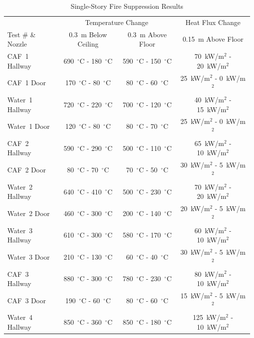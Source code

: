 \documentclass[12pt,oneside]{book}
\begin{document}
\begin{table}[!ht]
\centering
\caption{Single-Story Fire Suppression Results}\label{tab:Test_Results}
\begin{tabular}{lccc}
\toprule[1.5pt]
                 & \multicolumn{2}{c}{Temperature Change}                                    & Heat Flux Change \\
Test \# \& Nozzle	         & 0.3~m Below Ceiling                 & 0.3~m  Above Floor	                 & 0.15~m Above Floor \\
\midrule
CAF~1 Hallway    & 690~$^{\circ}$C - 180~$^{\circ}$C   & 590~$^{\circ}$C - 150~$^{\circ}$C   & 70~kW/m$^2$ - 20~kW/m$^2$  \\
CAF~1 Door       & 170~$^{\circ}$C - 80~$^{\circ}$C    & 80~$^{\circ}$C - 60~$^{\circ}$C     & 25~kW/m$^2$ - 0~kW/m$^2$  \\ [.25cm]
Water~1 Hallway  & 720~$^{\circ}$C - 220~$^{\circ}$C   & 700~$^{\circ}$C - 120~$^{\circ}$C   & 40~kW/m$^2$ - 15~kW/m$^2$  \\
Water~1 Door     & 120~$^{\circ}$C - 80~$^{\circ}$C    & 80~$^{\circ}$C - 70~$^{\circ}$C     & 25~kW/m$^2$ - 0~kW/m$^2$  \\ [.25cm]
CAF~2 Hallway    & 590~$^{\circ}$C - 290~$^{\circ}$C   & 500~$^{\circ}$C - 110~$^{\circ}$C   & 65~kW/m$^2$ - 10~kW/m$^2$  \\
CAF~2 Door       & 80~$^{\circ}$C -  70~$^{\circ}$C    & 70~$^{\circ}$C - 50~$^{\circ}$C     & 30~kW/m$^2$ - 5~kW/m$^2$  \\ [.25cm]
Water~2 Hallway  & 640~$^{\circ}$C - 410~$^{\circ}$C   & 500~$^{\circ}$C - 230~$^{\circ}$C   & 70~kW/m$^2$ - 20~kW/m$^2$  \\
Water~2 Door     & 460~$^{\circ}$C - 300~$^{\circ}$C   & 200~$^{\circ}$C - 140~$^{\circ}$C   & 20~kW/m$^2$ - 5~kW/m$^2$  \\ [.25cm]
Water~3 Hallway  & 610~$^{\circ}$C - 300~$^{\circ}$C   & 580~$^{\circ}$C - 170~$^{\circ}$C   & 60~kW/m$^2$ - 10~kW/m$^2$  \\
Water~3 Door     & 210~$^{\circ}$C - 130~$^{\circ}$C   & 60~$^{\circ}$C - 40~$^{\circ}$C     & 30~kW/m$^2$ - 5~kW/m$^2$  \\ [.25cm]
CAF~3 Hallway    & 880~$^{\circ}$C - 300~$^{\circ}$C   & 780~$^{\circ}$C - 230~$^{\circ}$C   & 80~kW/m$^2$ - 10~kW/m$^2$  \\
CAF~3 Door       & 190~$^{\circ}$C - 60~$^{\circ}$C    & 80~$^{\circ}$C - 60~$^{\circ}$C     & 15~kW/m$^2$ - 5~kW/m$^2$  \\ [.25cm]
Water~4 Hallway  & 850~$^{\circ}$C - 360~$^{\circ}$C   & 850~$^{\circ}$C - 180~$^{\circ}$C   & 125~kW/m$^2$ - 10~kW/m$^2$  \\

\end{tabular}
\end{table}
\end{document}
